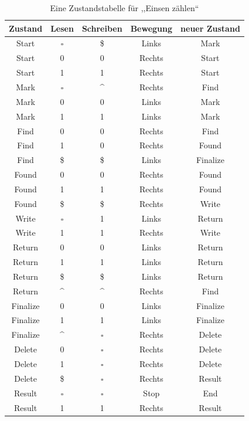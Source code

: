 \begin{table}
 \begin{center}
  \begin{tabular}{ccccc}
   \hline
    Zustand & Lesen     & Schreiben & Bewegung & neuer Zustand \\
   \hline \hline
    Start   & $\square$ & \$        & Links    & Mark \\
    Start   & 0         & 0         & Rechts   & Start \\
    Start   & 1         & 1         & Rechts   & Start \\
    Mark    & $\square$ & \^{}      & Rechts   & Find \\
    Mark    & 0         & 0         & Links    & Mark \\
    Mark    & 1         & 1         & Links    & Mark \\
    Find    & 0         & 0         & Rechts   & Find \\
    Find    & 1         & 0         & Rechts   & Found \\
    Find    & \$        & \$        & Links    & Finalize \\
    Found   & 0         & 0         & Rechts   & Found \\
    Found   & 1         & 1         & Rechts   & Found \\
    Found   & \$        & \$        & Rechts   & Write \\
    Write   & $\square$ & 1         & Links    & Return \\
    Write   & 1         & 1         & Rechts   & Write \\
    Return  & 0         & 0         & Links    & Return \\
    Return  & 1         & 1         & Links    & Return \\
    Return  & \$        & \$        & Links    & Return \\
    Return  & \^{}      & \^{}      & Rechts   & Find \\
    Finalize& 0         & 0         & Links    & Finalize \\
    Finalize& 1         & 1         & Links    & Finalize \\
    Finalize& \^{}      & $\square$ & Rechts   & Delete \\
    Delete  & 0         & $\square$ & Rechts   & Delete \\
    Delete  & 1         & $\square$ & Rechts   & Delete \\
    Delete  & \$        & $\square$ & Rechts   & Result \\
    Result  & $\square$ & $\square$ & Stop     & End \\
    Result  & 1         & 1         & Rechts   & Result \\
   \hline
  \end{tabular}
  \caption{Eine Zustandstabelle für ,,Einsen zählen``}
  \label{tab:count_ones}
 \end{center}
\end{table}

